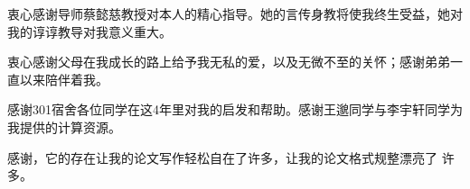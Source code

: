 \begin{acknowledgement}
  衷心感谢导师蔡懿慈教授对本人的精心指导。她的言传身教将使我终生受益，她对我的谆谆教导对我意义重大。

  衷心感谢父母在我成长的路上给予我无私的爱，以及无微不至的关怀；感谢弟弟一直以来陪伴着我。

  感谢301宿舍各位同学在这4年里对我的启发和帮助。感谢王邈同学与李宇轩同学为我提供的计算资源。

  感谢\thuthesis，它的存在让我的论文写作轻松自在了许多，让我的论文格式规整漂亮了
  许多。
\end{acknowledgement}
